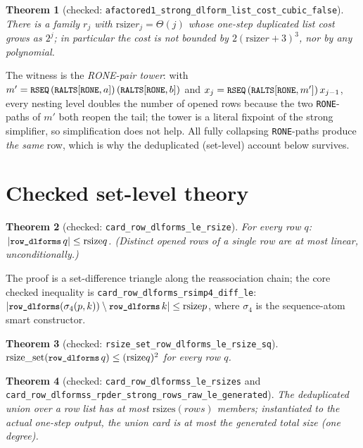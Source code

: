 \documentclass[11pt]{article}
\newtheorem{theorem}{Theorem}[section]
\newcommand{\rsize}{\mathrm{rsize}}
\newcommand{\rsizes}{\mathrm{rsizes}}
\newcommand{\rsizeset}{\mathrm{rsize\_set}}
\newcommand{\code}[1]{\texttt{\small #1}}
\begin{document}
\begin{theorem}[checked: \code{afactored1\_strong\_dlform\_list\_cost\_cubic\_false}]
There is a family $r_j$ with $\rsize r_j = \Theta(j)$ whose one-step
duplicated list cost grows as $2^j$; in particular the cost is not bounded by
$2(\rsize r+3)^3$, nor by any polynomial.
\end{theorem}

The witness is the \emph{RONE-pair tower}: with
$m' = \code{RSEQ}\,(\code{RALTS}[\code{RONE},a])\,(\code{RALTS}[\code{RONE},b])$
and $x_j = \code{RSEQ}\,(\code{RALTS}[\code{RONE},m'])\,x_{j-1}$, every
nesting level doubles the number of opened rows because the two
\code{RONE}-paths of $m'$ both reopen the tail; the tower is a literal
fixpoint of the strong simplifier, so simplification does not help.  All
fully collapsing \code{RONE}-paths produce \emph{the same} row, which is why
the deduplicated (set-level) account below survives.

\section{Checked set-level theory}

\begin{theorem}[checked: \code{card\_row\_dlforms\_le\_rsize}]
For every row $q$: $\,|\code{row\_dlforms}\,q| \le \rsize q$.  (Distinct
opened rows of a single row are at most linear, unconditionally.)
\end{theorem}

The proof is a set-difference triangle along the reassociation chain; the
core checked inequality is
\code{card\_row\_dlforms\_rsimp4\_diff\_le}:
$|\code{row\_dlforms}(\sigma_4(p,k)) \setminus \code{row\_dlforms}\,k| \le \rsize p$,
where $\sigma_4$ is the sequence-atom smart constructor.

\begin{theorem}[checked: \code{rsize\_set\_row\_dlforms\_le\_rsize\_sq}]
$\rsizeset(\code{row\_dlforms}\,q) \le (\rsize q)^2$ for every row $q$.
\end{theorem}

\begin{theorem}[checked: \code{card\_row\_dlformss\_le\_rsizes} and
\code{card\_row\_dlformss\_rpder\_strong\_rows\_raw\_le\_generated}]
The deduplicated union over a row list has at most $\rsizes(\textit{rows})$
members; instantiated to the actual one-step output, the union card is at
most the generated total size (one degree).
\end{theorem}
\end{document}
